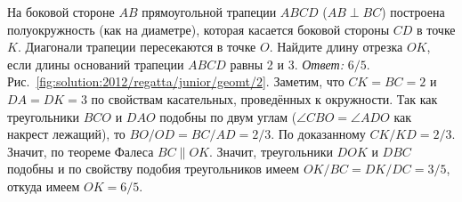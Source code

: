 \problem
На боковой стороне $AB$ прямоугольной трапеции $ABCD$ ($AB \perp BC$)
построена полуокружность (как на диаметре), которая касается боковой стороны
$CD$ в точке $K$.
Диагонали трапеции пересекаются в точке $O$.
Найдите длину отрезка $OK$, если длины оснований трапеции $ABCD$ равны 2 и 3.
%
\label{solution:2012/regatta/junior/geomt/2}%
\emph{Ответ:} $6 / 5$.
Рис.~\ref{fig:solution:2012/regatta/junior/geomt/2}.
Заметим, что $CK = BC = 2$ и $DA = DK = 3$ по свойствам касательных,
проведённых к окружности.
Так как треугольники $BCO$ и $DAO$ подобны по двум углам
($\angle CBO = \angle ADO$ как накрест лежащий),
то $BO / OD = BC / AD = 2 / 3$.
По доказанному $CK / KD = 2 / 3$.
Значит, по теореме Фалеса $BC \parallel OK$.
Значит, треугольники $DOK$ и $DBC$ подобны и по свойству подобия треугольников
имеем $OK / BC = DK / DC = 3 / 5$, откуда имеем $OK = 6 / 5$.
\endproblem
